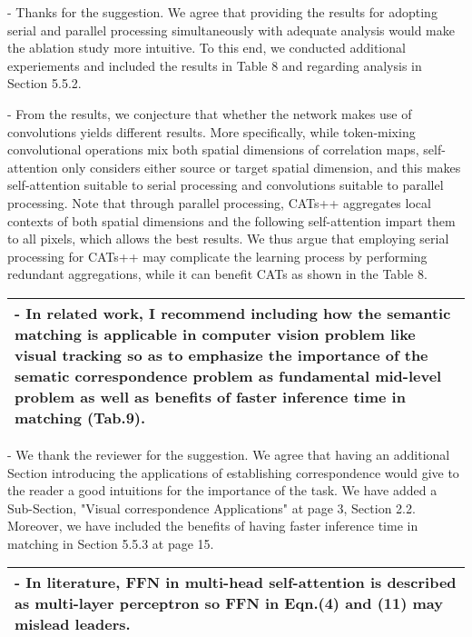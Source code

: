 \documentclass[11pt,draftclsnofoot,onecolumn]{IEEEtran}
\begin{document}
- Thanks for the suggestion. We agree that providing the results for adopting  serial and parallel processing simultaneously with adequate analysis would make the ablation study more intuitive. To this end, we conducted additional experiements and included the results in Table 8 and regarding analysis in Section 5.5.2. 

- From the results, we conjecture that whether the network makes use of convolutions yields different results. More specifically, while token-mixing convolutional operations mix both spatial dimensions of correlation maps, self-attention only considers either source or target spatial dimension, and this makes self-attention suitable to serial processing and convolutions suitable to parallel processing. Note that through parallel processing, CATs++ aggregates local contexts of both spatial dimensions and the following self-attention impart them to all pixels, which allows the best results. We thus argue that employing serial processing for CATs++ may complicate the learning process by performing redundant aggregations, while it can benefit CATs as shown in the Table 8. 



\newpage
\begin{longtable}{|p{16cm}|}
	\hline 

	
	\textbf{- In related work, I recommend including how the semantic matching is applicable in computer vision problem like visual tracking so as to emphasize the importance of the sematic correspondence problem as fundamental mid-level problem as well as benefits of faster inference time in matching (Tab.9). }\\

	
	\hline
\end{longtable}
- We thank the reviewer for the suggestion. We agree that having an additional Section introducing the applications of establishing correspondence would give to the reader a good intuitions for the importance of the task. We have added a Sub-Section, "Visual correspondence Applications" at page 3, Section 2.2. Moreover, we have included the benefits of having faster inference time in matching in Section 5.5.3 at page 15. 

\newpage
\begin{longtable}{|p{16cm}|}
	\hline 

	\textbf{- In literature, FFN in multi-head self-attention is described as multi-layer perceptron so FFN in Eqn.(4) and (11) may mislead leaders. }\\
	
	
	\hline
\end{longtable}
\end{document}
